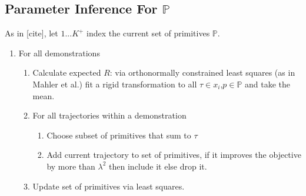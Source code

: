 \subsection{Parameter Inference For $\mathbb{P}$}

As in {[}cite{]}, let $1...K^{+}$ index the current set of primitives
$\mathbb{P}$.
\begin{enumerate}
\item For all demonstrations

\begin{enumerate}
\item Calculate expected $R$: via orthonormally constrained least squares
(as in Mahler et al.) fit a rigid transformation to all $\tau\in x_{i}$,$p\in\mathbb{P}$
and take the mean.
\item For all trajectories within a demonstration

\begin{enumerate}
\item Choose subset of primitives that sum to $\tau$
\item Add current trajectory to set of primitives, if it improves the objective
by more than $\lambda^{2}$ then include it else drop it.
\end{enumerate}
\item Update set of primitives via least squares.\end{enumerate}
\end{enumerate}